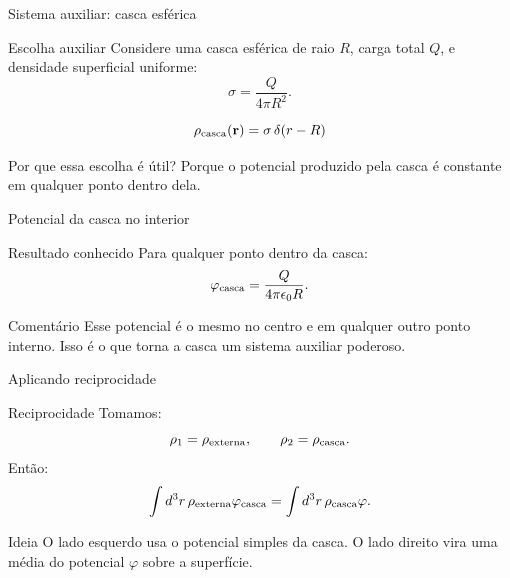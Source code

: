 \documentclass[aspectratio=169,11pt]{beamer}
\begin{document}
\begin{frame}{Sistema auxiliar: casca esférica}

\begin{mybox}{Escolha auxiliar}
Considere uma casca esférica de raio \(R\), carga total \(Q\), e densidade superficial uniforme:
\[
\sigma = \frac{Q}{4\pi R^2}.
\]
\end{mybox}

\begin{eqbox}
\begin{equation}
\rho_{\rm casca}(\mathbf r)
=
\sigma\,\delta(r-R)
\end{equation}
\end{eqbox}

\begin{alertblock}{Por que essa escolha é útil?}
Porque o potencial produzido pela casca é constante em qualquer ponto dentro dela.
\end{alertblock}

\end{frame}

\begin{frame}{Potencial da casca no interior}

\begin{mybox}{Resultado conhecido}
Para qualquer ponto dentro da casca:
\[
\varphi_{\rm casca}
=
\frac{Q}{4\pi\epsilon_0 R}.
\]
\end{mybox}

\begin{alertblock}{Comentário}
Esse potencial é o mesmo no centro e em qualquer outro ponto interno.
Isso é o que torna a casca um sistema auxiliar poderoso.
\end{alertblock}

\end{frame}

\begin{frame}{Aplicando reciprocidade}

\begin{mybox}{Reciprocidade}
Tomamos:
\[
\rho_1 = \rho_{\rm externa},
\qquad
\rho_2 = \rho_{\rm casca}.
\]
Então:
\[
\int d^3r\,\rho_{\rm externa}\varphi_{\rm casca}
=
\int d^3r\,\rho_{\rm casca}\varphi.
\]
\end{mybox}

\begin{alertblock}{Ideia}
O lado esquerdo usa o potencial simples da casca.
O lado direito vira uma média do potencial \(\varphi\) sobre a superfície.
\end{alertblock}

\end{frame}
\end{document}

